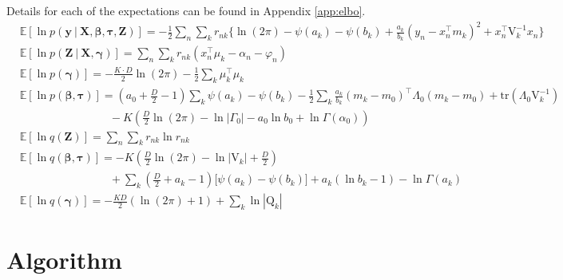 \documentclass[twoside,11pt]{article}
\newcommand\given[1][]{\:#1\vert\:}
\newcommand{\transpose}[1]{#1^{\intercal}}
\newcommand{\nsum}{\sum_{n}}
\newcommand{\ksum}{\sum_{k}}
\newcommand{\boldbeta}{\boldsymbol\beta}
\newcommand{\boldgamma}{\boldsymbol\gamma}
\newcommand{\boldtau}{\boldsymbol\tau}
\newcommand{\E}{\mathbb{E}}
\newcommand{\pr}[1]{p \left( #1 \right)}
\begin{document}
Details for each of the expectations can be found in Appendix \ref{app:elbo}. 
\begin{align*}
	& \E[\ln\pr{\mathbf{y} \given \mathbf{X}, \boldbeta, \boldtau, \mathbf{Z}}] = -\frac{1}{2}\nsum \ksum r_{nk} \Big\{ \ln (2\pi) - \psi(a_k) - \psi(b_k)  + \frac{a_k}{b_k}(y_n - \transpose{x_n}m_k)^2 + \transpose{x_n}\mathrm{V}_k^{-1}x_n \Big\} \\
	 & \E[\ln \pr{\mathbf{Z} \given \mathbf{X}, \boldgamma}] = \nsum \ksum r_{nk} \left( \transpose{x_n}\mu_k - \alpha_n - \varphi_n \right) \\
	 & \E[\ln \pr{\boldgamma}] = - \frac{K \cdot D}{2} \ln (2\pi) - \frac{1}{2} \ksum \transpose{\mu_k}\mu_k \\
	 & \E[\ln \pr{\boldbeta, \boldtau}] = \left( a_0 + \frac{D}{2} - 1 \right) \ksum \psi(a_k) - \psi(b_k) - \frac{1}{2} \ksum \frac{a_k}{b_k} \transpose{(m_k - m_0)} \Lambda_0 (m_k - m_0) + \mathrm{tr} \left( \Lambda_0 \mathrm{V}_{k}^{-1}\right)\\
	   & \qquad \qquad \qquad \qquad - K \left(\frac{D}{2}\ln(2\pi)  - \ln |\Gamma_0| - a_0 \ln b_0 + \ln \Gamma(\alpha_0) \right) \\
	& \E[\ln q(\mathbf{Z})] =  \nsum \ksum r_{nk} \ln r_{nk} \\
	& \E[\ln q(\boldbeta, \boldtau)] = -K \left( \frac{D}{2} \ln(2\pi) - \ln |\mathrm{V}_{k}| + \frac{D}{2}\right) \\
	& \qquad \qquad \qquad \qquad + \ksum \left( \frac{D}{2} + a_k - 1 \right) \big[\psi(a_k) - \psi(b_k) \big] + a_k (\ln b_k - 1) - \ln \Gamma(a_k) \\
	& \E[\ln q(\boldgamma)] = - \frac{KD}{2}(\ln (2\pi) + 1) + \sum_{k} \ln|\mathrm{Q}_k|
\end{align*}

\newpage

\section{Algorithm} \label{alg1}
\end{document}
